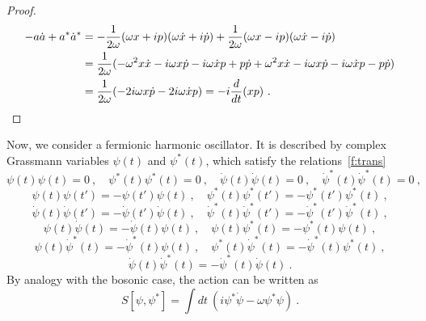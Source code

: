 \begin{proof}
\begin{equation*}
        \begin{aligned}
            - a \dot a + a^* \dot a^* & = - \frac{1}{2 \omega} (\omega x + i p) (\omega \dot x + i \dot p) + \frac{1}{2 \omega} (\omega x - i p) (\omega \dot x - i \dot p) \\ & = \frac{1}{2\omega} (- \omega^2 x \dot x - i \omega x \dot p - i \omega \dot x p + p \dot p + \omega^2 x \dot x - i \omega x \dot p - i \omega \dot x p - p \dot p) \\ & = \frac{1}{2 \omega} (- 2 i \omega x \dot p - 2 i \omega \dot x p) = - i\frac{d}{dt} (xp) ~.
        \end{aligned}
        \end{equation*}
    \end{proof}

    Now, we consider a fermionic harmonic oscillator. It is described by complex Grassmann variables $\psi(t)$ and $\psi^*(t)$, which satisfy the relations~\eqref{f:trans} 
    \begin{equation*}
        \psi(t) \psi(t) = 0 ~, \quad \psi^* (t) \psi^* (t) = 0 ~, \quad \dot \psi(t) \dot \psi(t) = 0 ~, \quad \dot \psi^* (t) \dot \psi^* (t) = 0 ~,
    \end{equation*}
    \begin{equation*}
        \psi(t) \psi(t') = - \psi (t') \psi (t) ~, \quad \psi^* (t) \psi^* (t') = - \psi^* (t') \psi^* (t) ~,
    \end{equation*}
    \begin{equation*}
        \dot \psi(t) \dot \psi(t') = - \dot \psi (t') \dot \psi (t) ~, \quad \dot \psi^* (t) \dot \psi^* (t') = - \dot \psi^* (t') \dot \psi^* (t) ~,
    \end{equation*}
    \begin{equation*}
        \psi(t) \dot \psi(t) = - \dot \psi (t) \psi (t) ~, \quad \psi(t) \psi^* (t) = - \psi^* (t) \psi (t) ~,
    \end{equation*}
    \begin{equation*}
        \psi(t) \dot \psi^*(t) = - \dot \psi^* (t) \psi (t) ~, \quad \psi^*(t) \dot \psi^* (t) = - \dot \psi^* (t) \psi^* (t) ~,
    \end{equation*}
    \begin{equation*}
        \dot \psi(t) \dot \psi^* (t) = - \dot \psi^* (t) \dot \psi (t) ~.
    \end{equation*}
    By analogy with the bosonic case, the action can be written as
    \begin{equation*}
        S[\psi, \psi^*] = \int dt ~ (i \psi^* \dot \psi - \omega \psi^* \psi)  ~.
    \end{equation*}

